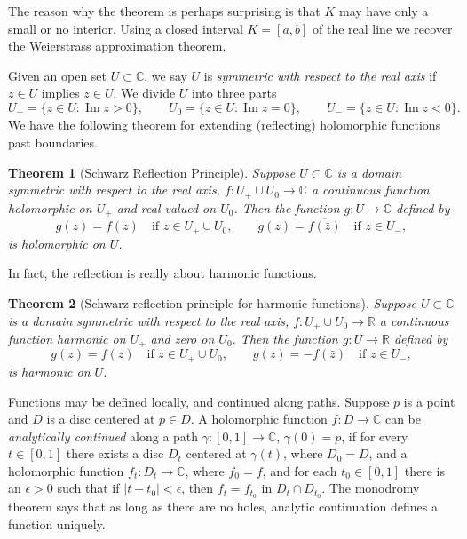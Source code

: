 \documentclass[12pt,openany]{book}
\renewcommand{\Im}{\operatorname{Im}}
\newcommand{\sabs}[1]{\lvert {#1} \rvert}
\newcommand{\C}{{\mathbb{C}}}
\newcommand{\R}{{\mathbb{R}}}
\newcommand{\myindex}[1]{#1\index{#1}}
\theoremstyle{plain}
\newtheorem{thm}{Theorem}[section]
\theoremstyle{remark}
\theoremstyle{definition}
\theoremstyle{exercise}
\theoremstyle{example}
\begin{document}
The reason why the theorem is perhaps
surprising is that $K$ may have only a
small or no interior.  Using a closed interval $K=[a,b]$ of the real line we
recover the Weierstrass approximation theorem.

\medskip

Given an open set $U \subset \C$, we say $U$ is
\emph{\myindex{symmetric with respect to the real axis}} if
$z \in U$ implies $\bar{z} \in U$.  We divide $U$ into
three parts
\begin{equation*}
U_+ = \{ z \in U : \Im z > 0 \}, \qquad
U_0 = \{ z \in U : \Im z = 0 \}, \qquad
U_- = \{ z \in U : \Im z < 0 \}.
\end{equation*}
We have the following theorem for extending (reflecting) holomorphic functions past
boundaries.

\begin{thm}[Schwarz Reflection Principle]
%
Suppose $U \subset \C$ is a domain symmetric with respect to the real axis, 
$f \colon U_+ \cup U_0 \to \C$ a continuous function holomorphic on $U_+$
and real valued on $U_0$.  Then the function $g \colon U \to \C$
defined by
\begin{equation*}
g(z) = f(z) \quad \text{if $z \in U_+ \cup U_0$},
\qquad
g(z) = 
\overline{f(\bar{z})} \quad \text{if $z \in U_-$},
\end{equation*}
is holomorphic on $U$.
\end{thm}

In fact, the reflection is really about harmonic functions.

\begin{thm}[Schwarz reflection principle for harmonic functions]
Suppose $U \subset \C$ is a domain symmetric with respect to the real axis, 
$f \colon U_+ \cup U_0 \to \R$ a continuous function harmonic on $U_+$
and zero on $U_0$.  Then the function $g \colon U \to \R$
defined by
\begin{equation*}
g(z) = f(z) \quad \text{if $z \in U_+ \cup U_0$},
\qquad
g(z) = 
-f(\bar{z}) \quad \text{if $z \in U_-$},
\end{equation*}
is harmonic on $U$.
\end{thm}

Functions may be defined locally, and continued along paths.
Suppose $p$ is a point and $D$ is a disc centered at $p \in D$.
A holomorphic function $f \colon D \to \C$ can be
\emph{analytically continued}
along a path
$\gamma \colon [0,1] \to \C$, $\gamma(0) = p$,
if for every $t \in [0,1]$ there exists
a disc $D_t$ centered at $\gamma(t)$, where $D_0=D$, and a holomorphic function
$f_t \colon D_t \to \C$, where $f_0 = f$, and for each $t_0 \in [0,1]$ there is an
$\epsilon > 0$ such that if $\sabs{t-t_0} < \epsilon$, then
$f_t = f_{t_0}$
in $D_t \cap D_{t_0}$.  The monodromy theorem says that as long as there are
no holes, analytic continuation defines a function uniquely.
\end{document}
